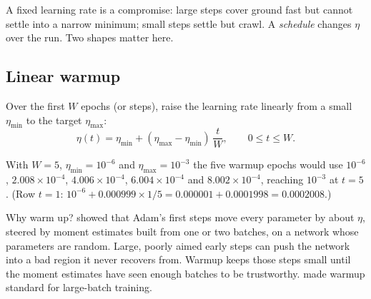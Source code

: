 A fixed learning rate is a compromise: large steps cover ground fast but cannot settle into a
narrow minimum; small steps settle but crawl. A \emph{schedule}
changes $\eta$ over the run. Two shapes matter here.

\subsection{Linear warmup}\label{sec:trainloop:warmup}

\begin{definition}
Over the first $W$ epochs (or steps), raise the learning rate linearly from a small $\eta_{\min}$
to the target $\eta_{\max}$:
\[
\eta(t) = \eta_{\min} + (\eta_{\max} - \eta_{\min})\,\frac{t}{W}, \qquad 0 \le t \le W.
\]
\end{definition}
With $W = 5$, $\eta_{\min} = 10^{-6}$ and $\eta_{\max} = 10^{-3}$ the five warmup epochs would use
$10^{-6}$, $2.008 \times 10^{-4}$, $4.006 \times 10^{-4}$, $6.004 \times 10^{-4}$ and $8.002
\times 10^{-4}$, reaching $10^{-3}$ at $t = 5$. (Row $t = 1$: $10^{-6} + 0.000999 \times 1/5 =
0.000001 + 0.0001998 = 0.0002008$.)

Why warm up?  showed that Adam's first steps move every parameter by
about $\eta$, steered by moment estimates built from one or two batches, on a network whose
parameters are random. Large, poorly aimed early steps can push the network into a bad region
it never recovers from. Warmup keeps those steps small until the moment estimates have seen
enough batches to be trustworthy. \citet{goyal2017accurate} made warmup standard for large-batch
training.

